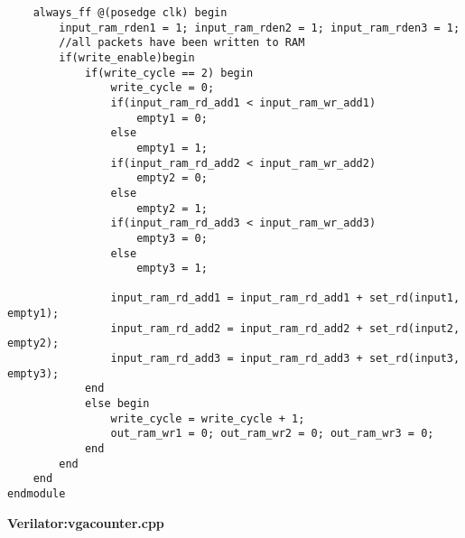 \documentclass[twoside,12pt,fleqn]{book} %
\begin{document}
\begin{lstlisting}
    always_ff @(posedge clk) begin
        input_ram_rden1 = 1; input_ram_rden2 = 1; input_ram_rden3 = 1;
        //all packets have been written to RAM
        if(write_enable)begin
            if(write_cycle == 2) begin
                write_cycle = 0;
                if(input_ram_rd_add1 < input_ram_wr_add1)
                    empty1 = 0;
                else
                    empty1 = 1;
                if(input_ram_rd_add2 < input_ram_wr_add2)
                    empty2 = 0;
                else
                    empty2 = 1;
                if(input_ram_rd_add3 < input_ram_wr_add3)
                    empty3 = 0;
                else
                    empty3 = 1;

                input_ram_rd_add1 = input_ram_rd_add1 + set_rd(input1, empty1);
                input_ram_rd_add2 = input_ram_rd_add2 + set_rd(input2, empty2);
                input_ram_rd_add3 = input_ram_rd_add3 + set_rd(input3, empty3);
            end
            else begin
                write_cycle = write_cycle + 1;
                out_ram_wr1 = 0; out_ram_wr2 = 0; out_ram_wr3 = 0;
            end
        end
    end
endmodule

\end{lstlisting}
\newpage 
\textbf{Verilator:vgacounter.cpp}
\end{document}
